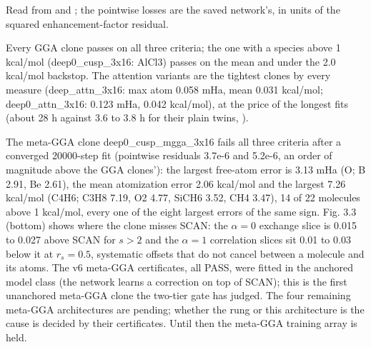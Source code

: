 \documentclass[10pt,a4paper]{article}
\begin{document}
Read from  and ; the pointwise losses are the saved network's, in units of the squared enhancement-factor residual.

Every GGA clone passes on all three criteria; the one with a species above 1 kcal/mol (deep0\_cusp\_3x16: AlCl3) passes on the mean and under the 2.0 kcal/mol backstop. The attention variants are the tightest clones by every measure (deep\_attn\_3x16: max atom 0.058 mHa, mean 0.031 kcal/mol; deep0\_attn\_3x16: 0.123 mHa, 0.042 kcal/mol), at the price of the longest fits (about 28 h against 3.6 to 3.8 h for their plain twins, ).

The meta-GGA clone deep0\_cusp\_mgga\_3x16 fails all three criteria after a converged 20000-step fit (pointwise residuals 3.7e-6 and 5.2e-6, an order of magnitude above the GGA clones'): the largest free-atom error is 3.13 mHa (O; B 2.91, Be 2.61), the mean atomization error 2.06 kcal/mol and the largest 7.26 kcal/mol (C4H6; C3H8 7.19, O2 4.77, SiCH6 3.52, CH4 3.47), 14 of 22 molecules above 1 kcal/mol, every one of the eight largest errors of the same sign. Fig. 3.3 (bottom) shows where the clone misses SCAN: the $\alpha = 0$ exchange slice is 0.015 to 0.027 above SCAN for $s > 2$ and the $\alpha = 1$ correlation slices sit 0.01 to 0.03 below it at $r_s = 0.5$, systematic offsets that do not cancel between a molecule and its atoms. The v6 meta-GGA certificates, all PASS, were fitted in the anchored model class (the network learns a correction on top of SCAN); this is the first unanchored meta-GGA clone the two-tier gate has judged. The four remaining meta-GGA architectures are pending; whether the rung or this architecture is the cause is decided by their certificates. Until then the meta-GGA training array is held.
\end{document}
